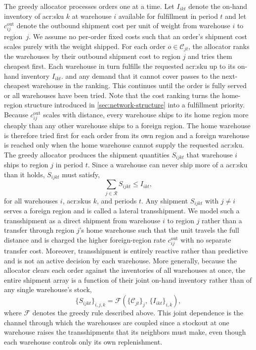 The greedy allocator processes orders one at a time. Let $I_{ikt}$ denote the on-hand inventory of \gls{acr:sku} $k$ at warehouse $i$ available for fulfillment in period $t$ and let $c^{\mathrm{out}}_{ij}$ denote the outbound shipment cost per unit of weight from warehouse $i$ to region~$j$. We assume no per-order fixed costs such that an order's shipment cost scales purely with the weight shipped. For each order $o \in \mathcal{C}_{jt}$, the allocator ranks the warehouses by their outbound shipment cost to region $j$ and tries them cheapest first. Each warehouse in turn fulfills the requested \gls{acr:sku} up to its on-hand inventory $I_{ikt}$. and any demand that it cannot cover passes to the next-cheapest warehouse in the ranking. This continues until the order is fully served or all warehouses have been tried. Note that the cost ranking turns the home-region structure introduced in \autoref{sec:network-structure} into a fulfillment priority. Because $c^{\mathrm{out}}_{ij}$ scales with distance, every warehouse ships to its home region more cheaply than any other warehouse ships to a foreign region. The home warehouse is therefore tried first for each order from its own region and a foreign warehouse is reached only when the home warehouse cannot supply the requested \gls{acr:sku}. The greedy allocator produces the shipment quantities $S_{ijkt}$ that warehouse $i$ ships to region $j$ in period $t$. Since a warehouse can never ship more of a \gls{acr:sku} than it holds, $S_{ijkt}$ must satisfy,
  \begin{equation}
  \label{eq:shipment-feasibility}
  \sum_{j \in \mathcal{R}} S_{ijkt} \le I_{ikt}, 
\end{equation}
for all warehouses $i$, \glspl{acr:sku} $k$, and periods $t$. Any shipment $S_{ijkt}$ with $j \ne i$ serves a foreign region and is called a lateral transshipment. We model such a transshipment as a direct shipment from warehouse $i$ to region $j$ rather than a transfer through region $j$'s home warehouse such that the unit travels the full distance and is charged the higher foreign-region rate $c^{\mathrm{out}}_{ij}$ with no separate transfer cost. Moreover, transshipment is entirely reactive rather than predictive \citep{paterson2011multiechelon} and is not an active decision by each warehouse. More generally, because the allocator clears each order against the inventories of all warehouses at once, the entire shipment array is a function of their joint on-hand inventory rather than of any single warehouse's  stock,
\begin{equation}
\label{eq:allocation-map}
  \{S_{ijkt}\}_{i,j,k} = \mathcal{F}\!\left(\{ \mathcal{C}_{jt}\}_{j},\, \{I_{ikt}\}_{i,k}\right),
\end{equation}
where $\mathcal{F}$ denotes the greedy rule described above. This joint dependence is the channel through which the warehouses are coupled since a stockout at one warehouse raises the transshipments that its neighbors must make, even though each warehouse controls only its own replenishment.

